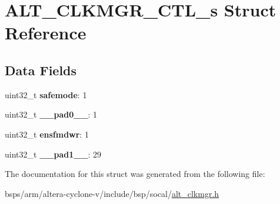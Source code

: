\hypertarget{structALT__CLKMGR__CTL__s}{}\section{A\+L\+T\+\_\+\+C\+L\+K\+M\+G\+R\+\_\+\+C\+T\+L\+\_\+s Struct Reference}
\label{structALT__CLKMGR__CTL__s}
\subsection*{Data Fields}
\begin{DoxyCompactItemize}
\item 
\mbox{\label{structALT__CLKMGR__CTL__s_ac870dcefff7befc4299c0b3dfcd46fef}} 
uint32\+\_\+t {\bfseries safemode}\+: 1
\item 
\mbox{\label{structALT__CLKMGR__CTL__s_a150c47ed7fdbad44bcab737a16506f85}} 
uint32\+\_\+t {\bfseries \+\_\+\+\_\+pad0\+\_\+\+\_\+}\+: 1
\item 
\mbox{\label{structALT__CLKMGR__CTL__s_a978dc5e857b6ce470b221fe210162a32}} 
uint32\+\_\+t {\bfseries ensfmdwr}\+: 1
\item 
\mbox{\label{structALT__CLKMGR__CTL__s_ad580bd4f82b8e0d2f856229ba5abe08b}} 
uint32\+\_\+t {\bfseries \+\_\+\+\_\+pad1\+\_\+\+\_\+}\+: 29
\end{DoxyCompactItemize}


The documentation for this struct was generated from the following file\+:\begin{DoxyCompactItemize}
\item 
bsps/arm/altera-\/cyclone-\/v/include/bsp/socal/\mbox{\hyperlink{alt__clkmgr_8h}{alt\+\_\+clkmgr.\+h}}\end{DoxyCompactItemize}
